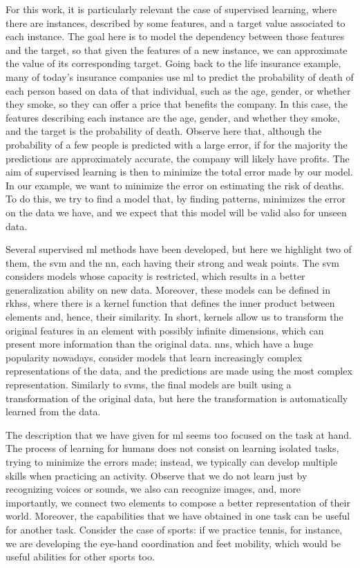 For this work, it is particularly relevant the case of supervised learning, where there are instances, described by some features, and a target value associated to each instance. The goal here is to model the dependency between those features and the target, so that given the features of a new instance, we can approximate the value of its corresponding target. Going back to the life insurance example, many of today's insurance companies use \acrshort{ml} to predict the probability of death of each person based on data of that individual, such as the age, gender, or whether they smoke, so they can offer a price that benefits the company. In this case, the features describing each instance are the age, gender, and whether they smoke, and the target is the probability of death.
%
Observe here that, although the probability of a few people is predicted with a large error, if for the majority the predictions are approximately accurate, the company will likely have profits.
%
The aim of supervised learning is then to minimize the total error made by our model. In our example, we want to minimize the error on estimating the risk of deaths.
%
To do this, we try to find a model that, by finding patterns, minimizes the error on the data we have, and we expect that this model will be valid also for unseen data.

Several supervised \acrshort{ml} methods have been developed, but here we highlight two of them, the \acrfull{svm} and the \acrfull{nn}, each having their strong and weak points. 
%
The \acrfull{svm} considers models whose capacity is restricted, which results in a better generalization ability on new data. Moreover, these models can be defined in \acrfull{rkhss}, where there is a kernel function that defines the inner product between elements and, hence, their similarity. In short, kernels allow us to transform the original features in an element with possibly infinite dimensions, which can present more information than the original data. 
%
\acrfull{nns}, which have a huge popularity nowadays, consider models that learn increasingly complex representations of the data, and the predictions are made using the most complex representation. Similarly to \acrshort{svms}, the final models are built using a transformation of the original data, but here the transformation is automatically learned from the data.

The description that we have given for \acrshort{ml} seems too focused on the task at hand. The process of learning for humans does not consist on learning isolated tasks, trying to minimize the errors made; instead, we typically can develop multiple skills when practicing an activity. Observe that we do not learn just by recognizing voices or sounds, we also can recognize images, and, more importantly, we connect two elements to compose a better representation of their world.
Moreover, the capabilities that we have obtained in one task can be useful for another task. Consider the case of sports: if we practice tennis, for instance, we are developing the eye-hand coordination and feet mobility, which would be useful abilities for other sports too.
%

